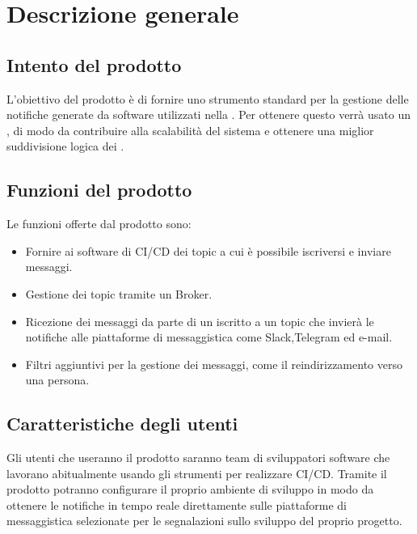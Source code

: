 \section{Descrizione generale}

	\subsection{Intento del prodotto}
    
    L'obiettivo del prodotto è di fornire uno strumento standard per la gestione delle notifiche generate da software utilizzati nella .
    Per ottenere questo verrà usato un , di modo da contribuire alla scalabilità del sistema e ottenere una miglior suddivisione logica dei .
	
	\subsection{Funzioni del prodotto}
	
    Le funzioni offerte dal prodotto sono:
    \begin{itemize}
		\item Fornire ai software di CI/CD dei topic a cui è possibile iscriversi e inviare messaggi.
		\item Gestione dei topic tramite un Broker.
        \item Ricezione dei messaggi da parte di un  iscritto a un topic che invierà le notifiche alle piattaforme di messaggistica come Slack,Telegram ed e-mail.
        \item Filtri aggiuntivi per la gestione dei messaggi, come il reindirizzamento verso una persona.
	\end{itemize}

	\subsection{Caratteristiche degli utenti}
    
    Gli utenti che useranno il prodotto saranno team di sviluppatori software che lavorano abitualmente usando gli strumenti per realizzare CI/CD.
    Tramite il prodotto potranno configurare il proprio ambiente di sviluppo in modo da ottenere le notifiche in tempo reale direttamente sulle piattaforme di messaggistica selezionate per le segnalazioni sullo sviluppo del proprio progetto.
	


